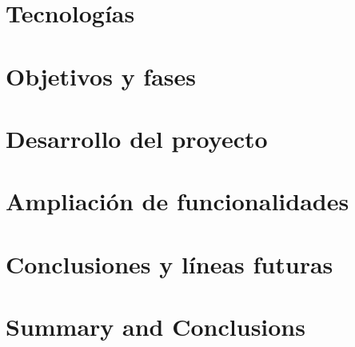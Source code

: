 \documentclass[spanish,a4paper,14pt,oneside]{extreport}
\begin{document}
\chapter{Tecnologías}
\label{chapter:tres}




\chapter{Objetivos y fases}
\label{chapter:cuatro}



\newpage{\pagestyle{empty}}
\thispagestyle{empty}

\chapter{Desarrollo del proyecto}
\label{chapter:cinco}



\newpage{\pagestyle{empty}}
\thispagestyle{empty}

\chapter{Ampliación de funcionalidades}
\label{chapter:seis}



\newpage{\pagestyle{empty}}
\thispagestyle{empty}

\chapter{Conclusiones y líneas futuras }
\label{chapter:Conclusiones}



\newpage{\pagestyle{empty}}
\thispagestyle{empty}

\chapter{Summary and Conclusions }
\label{chapter:ingles}
\end{document}
